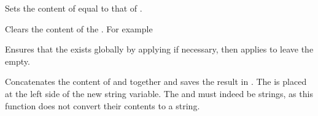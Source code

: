 \documentclass[oneside]{book}
\begin{document}
\begin{function}{\StrSetEq}
\begin{syntax}
  
\end{syntax}
Sets the content of  equal to that of .
\begin{demohigh}
\StrSet {}
\StrSetEq \lTmpbStr \lTmpaStr
\StrUse \lTmpbStr
\end{demohigh}
\end{function}

\begin{function}{\StrClear}
\begin{syntax}
 
\end{syntax}
Clears the content of the . For example
\begin{demohigh}
\StrSet {}
\StrClear \lTmpjStr
\StrSet {}
\StrUse \lTmpjStr
\end{demohigh}
\end{function}

\begin{function}{\StrClearNew}
\begin{syntax}
 
\end{syntax}
Ensures that the  exists globally by applying
 if necessary, then applies  to leave
the  empty.
\begin{codehigh}
\StrClearNew \lFooSomeStr
\StrUse \lFooSomeStr
\end{codehigh}
\end{function}

\begin{function}{\StrConcat}
\begin{syntax}
   
\end{syntax}
Concatenates the content of  and 
together and saves the result in . The 
is placed at the left side of the new string variable.
The  and  must indeed be strings, as
this function does not convert their contents to a string.
\begin{demohigh}
\StrSet {}
\StrSet {}
\StrConcat \lTmpaStr \lTmpbStr \lTmpcStr
\StrUse \lTmpaStr
\end{demohigh}
\end{function}
\end{document}

